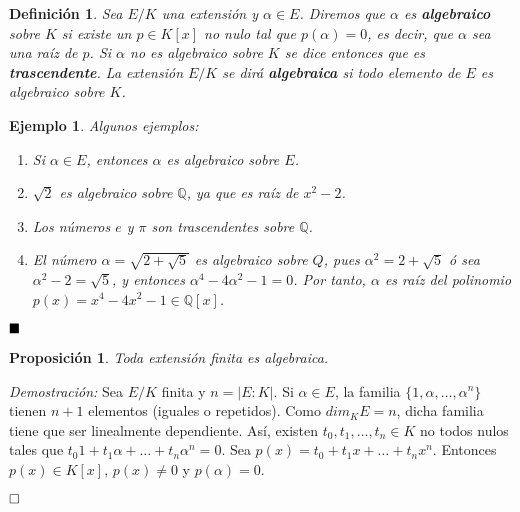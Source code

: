 \documentclass[12pt]{article}
\newtheorem{proposition}[theorem]{Proposición}
\newtheorem{definition}[theorem]{Definición}
\newtheorem{example}{Ejemplo}[theorem]
\begin{document}
\begin{definition} Sea  $E/K$ una extensión y $\alpha \in E$. Diremos que $\alpha$ es \textbf{algebraico} sobre $K$ si existe un $p \in K[x]$ no nulo tal que $p(\alpha) = 0$, es decir, que $\alpha$ sea una raíz de $p$. Si $\alpha$ no es algebraico sobre $K$ se dice entonces que es \textbf{trascendente}. La extensión $E/K$ se dirá \textbf{algebraica} si todo elemento de $E$ es algebraico sobre $K$.
\end{definition}
\begin{example} Algunos ejemplos: \begin{enumerate}
\item Si $\alpha \in E$, entonces $\alpha$ es algebraico sobre $E$.
\item $\sqrt{2}$ es algebraico sobre $\mathbb{Q}$, ya que es raíz de $x^{2}-2$.
\item Los números $e$ y $\pi$ son trascendentes  sobre $\mathbb{Q}$.
\item El número $\alpha = \sqrt{2 + \sqrt{5}}$ es algebraico sobre $Q$, pues $\alpha^{2} = 2 + \sqrt{5}$ ó sea $\alpha^{2}-2 = \sqrt{5}$, y entonces $\alpha^{4}-4\alpha^{2}-1 = 0$. Por tanto, $\alpha$ es raíz del polinomio $p(x) = x^{4}-4x^{2}-1 \in \mathbb{Q}[x]$.
\end{enumerate}
\end{example}

$\hfill \blacksquare$

\begin{proposition} Toda extensión finita es algebraica.
\end{proposition}
\emph{Demostración: } Sea $E/K$ finita y $n = |E:K|$. Si $\alpha \in E$, la familia $\lbrace 1, \alpha, \ldots, \alpha^{n} \rbrace$ tienen $n+1$ elementos (iguales o repetidos). Como $dim_{K} E = n$, dicha familia tiene que ser linealmente dependiente. Así, existen $t_{0}, t_{1}, \ldots, t_{n} \in K$ no todos nulos tales que $t_{0}1 + t_{1}\alpha + \ldots + t_{n}\alpha^{n} = 0$. Sea $p(x) = t_{0} + t_{1}x + \ldots + t_{n}x^{n}$. Entonces $p(x) \in K[x]$, $p(x) \neq 0$ y $p(\alpha) = 0.$

$\hfill \square$
\end{document}

